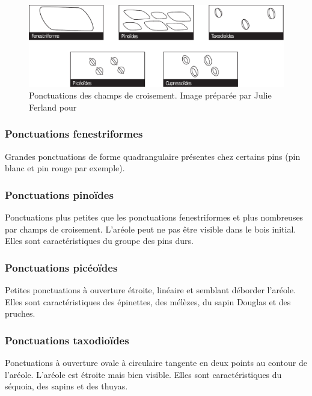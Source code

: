 \begin{figure}[h]
	\centering
	\includegraphics[scale=0.7]{img/ch3_ponctuations}
	\caption{Ponctuations des champs de croisement. Image préparée par Julie Ferland pour \cite{achim2010dendroecologie}}
	\label{fig:ponctuations}
\end{figure}
	
\subsubsection{Ponctuations fenestriformes}

Grandes ponctuations de forme quadrangulaire présentes chez certains pins (pin blanc et pin rouge par exemple).

\subsubsection{Ponctuations pinoïdes}

Ponctuations plus petites que les ponctuations fenestriformes et plus nombreuses par champs de croisement. L'aréole peut ne pas être visible dans le bois initial. Elles sont caractéristiques du groupe des pins durs.

\subsubsection{Ponctuations picéoïdes}

Petites ponctuations à ouverture étroite, linéaire et semblant déborder l'aréole. Elles sont caractéristiques des épinettes, des mélèzes, du sapin Douglas et des pruches.

\subsubsection{Ponctuations taxodioïdes}

Ponctuations à ouverture ovale à circulaire tangente en deux points au contour de l'aréole. L'aréole est étroite mais bien visible. Elles sont caractéristiques du séquoia, des sapins et des thuyas.

